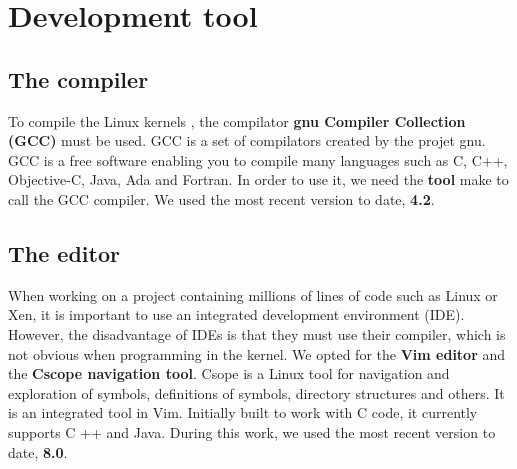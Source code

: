 \section{Development tool}
\subsection{The compiler}
To compile the Linux \glspl{kernel} , the compilator \textbf{\acrshort{gnu} Compiler Collection (GCC)} must be used. GCC is a set of compilators created by the projet \acrshort{gnu}. GCC is a free software enabling you to compile many languages such as C, C++, Objective-C, Java, Ada and Fortran. In order to use it, we need the \textbf{tool} make to call the GCC compiler. We used the most recent version to date, \textbf{4.2}.
\subsection{The editor}

When working on a project containing millions of lines of code such as Linux or Xen, it is important to use an integrated development environment (IDE). However, the disadvantage of IDEs is that they must use their compiler, which is not obvious when programming in the kernel. We opted for the \textbf{Vim editor} and the \textbf{Cscope navigation tool}. Csope is a Linux tool for navigation and exploration of symbols, definitions of symbols, directory structures and others. It is an integrated tool in Vim. Initially built to work with C code, it currently supports C ++ and Java. During this work, we used the most recent version to date, \textbf{8.0}.

